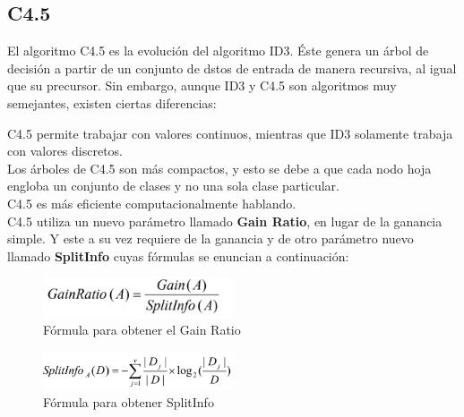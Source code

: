 \subsection{C4.5} \label{c4.5}
El algoritmo C4.5 es la evolución del algoritmo ID3. Éste genera un árbol de decisión a partir de un conjunto de dstos de entrada de manera recursiva, al igual que su precursor. Sin embargo, aunque ID3 y C4.5 son algoritmos muy semejantes, existen ciertas diferencias:\\

\begin{UClist}
	\UCli C4.5 permite trabajar con valores continuos, mientras que ID3 solamente trabaja con valores discretos.\\
	\UCli Los árboles de C4.5 son más compactos, y esto se debe a que cada nodo hoja engloba un conjunto de clases y no una sola clase particular.\\
	\UCli C4.5 es más eficiente computacionalmente hablando.\\
	\UCli C4.5 utiliza un nuevo parámetro llamado \textbf{Gain Ratio}, en lugar de la ganancia simple. Y este a su vez requiere de la ganancia y de otro parámetro nuevo llamado \textbf{SplitInfo} cuyas fórmulas se enuncian a continuación:
	
	\begin{figure}[H]
		\hypertarget{fig:formula-gainratio}{\hspace{1pt}}
		\begin{center}
			\includegraphics[width=0.5\textwidth]{capitulo2/images/formula-gainratio.png}
			\caption{Fórmula para obtener el Gain Ratio}
			\label{fig:formula-gainratio}
		\end{center}
	\end{figure}

	\begin{figure}[H]
		\hypertarget{fig:formula-splitinfo}{\hspace{1pt}}
		\begin{center}
			\includegraphics[width=0.5\textwidth]{capitulo2/images/formula-splitinfo.png}
			\caption{Fórmula para obtener SplitInfo}
			\label{fig:formula-splitinfo}
		\end{center}
	\end{figure}

\end{UClist}

